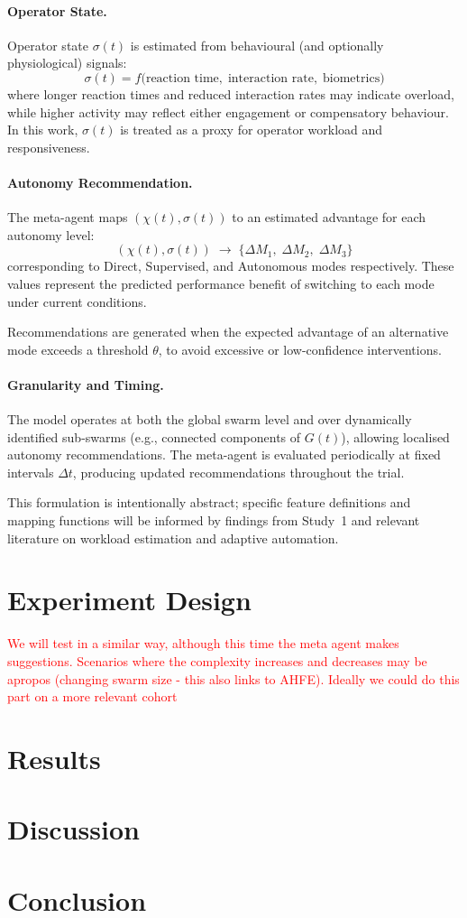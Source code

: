 \documentclass[10pt]{article}
\theoremstyle{definition}
\begin{document}
\paragraph{Operator State.}
Operator state $\sigma(t)$ is estimated from behavioural (and optionally physiological) signals:
\[
\sigma(t) = f\bigl(\text{reaction time},\; \text{interaction rate},\; \text{biometrics}\bigr)
\]
where longer reaction times and reduced interaction rates may indicate overload, while higher activity may reflect either engagement or compensatory behaviour. In this work, $\sigma(t)$ is treated as a proxy for operator workload and responsiveness.

\paragraph{Autonomy Recommendation.}
The meta-agent maps $(\chi(t), \sigma(t))$ to an estimated advantage for each autonomy level:
\[
(\chi(t), \sigma(t)) \;\longrightarrow\; \{\Delta M_1,\; \Delta M_2,\; \Delta M_3\}
\]
corresponding to Direct, Supervised, and Autonomous modes respectively. These values represent the predicted performance benefit of switching to each mode under current conditions.

Recommendations are generated when the expected advantage of an alternative mode exceeds a threshold $\theta$, to avoid excessive or low-confidence interventions.

\paragraph{Granularity and Timing.}
The model operates at both the global swarm level and over dynamically identified sub-swarms (e.g., connected components of $G(t)$), allowing localised autonomy recommendations. The meta-agent is evaluated periodically at fixed intervals $\Delta t$, producing updated recommendations throughout the trial.

\vspace{0.5em}
\noindent
This formulation is intentionally abstract; specific feature definitions and mapping functions will be informed by findings from Study~1 and relevant literature on workload estimation and adaptive automation.


\section{Experiment Design}
\textcolor{red}{We will test in a similar way, although this time the meta agent makes suggestions. Scenarios where the complexity increases and decreases may be apropos (changing swarm size - this also links to AHFE). Ideally we could do this part on a more relevant cohort}

\section{Results}


\section{Discussion}



\section{Conclusion}\label{sec:conclusion}





\end{document}
